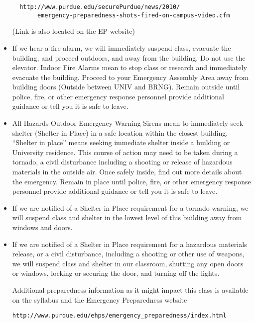 \documentclass[10pt]{article}
\begin{document}
\begin{itemize}
\begin{verbatim}
  http://www.purdue.edu/securePurdue/news/2010/
       emergency-preparedness-shots-fired-on-campus-video.cfm
\end{verbatim}

(Link is also located on the EP website)

\item If we hear a fire alarm, we will immediately suspend class,
evacuate the building, and proceed outdoors, and away from the
building. Do not use the elevator. Indoor Fire Alarms mean to stop
class or research and immediately evacuate the building. Proceed to
your Emergency Assembly Area away from building doors (Outside 
between UNIV and BRNG). Remain outside until police, fire, or other 
emergency response personnel provide additional guidance or tell you 
it is safe to leave.

\item All Hazards Outdoor Emergency Warning Sirens mean to immediately
seek shelter (Shelter in Place) in a safe location within the closest
building. ``Shelter in place'' means seeking immediate shelter
inside a building or University residence. This course of action may
need to be taken during a tornado, a civil disturbance including a
shooting or release of hazardous materials in the outside air. Once
safely inside, find out more details about the emergency. Remain in
place until police, fire, or other emergency response personnel
provide additional guidance or tell you it is safe to leave.

\item  If we are notified of a Shelter in Place requirement for a tornado
    warning, we will suspend class and shelter in the lowest level of this
    building away from windows and doors.

\item  If we are notified of a Shelter in Place requirement for a hazardous
    materials release, or a civil disturbance, including a shooting or other
    use of weapons, we will suspend class and shelter in our classroom,
    shutting any open doors or windows, locking or securing the door, and
    turning off the lights.

Additional preparedness information as it might impact this class is
available on the syllabus and the Emergency Preparedness website
\begin{verbatim}http://www.purdue.edu/ehps/emergency_preparedness/index.html
\end{verbatim}
\end{itemize}
\end{document}
